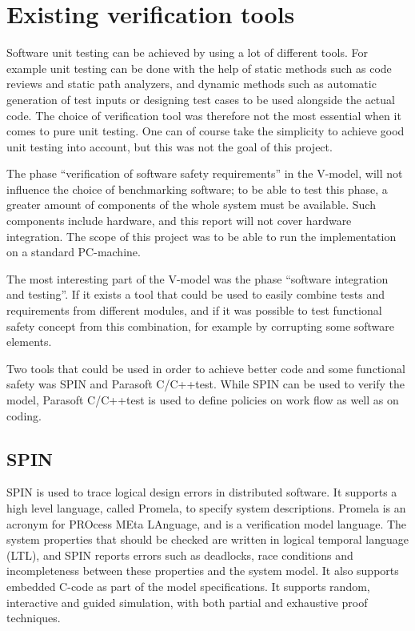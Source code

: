 \section{Existing verification tools}
\label{SEC:EXISTING_TOOLS}
Software unit testing can be achieved by using a lot of different tools. For
example unit testing can be done with the help of static methods such as code
reviews and static path analyzers, and dynamic methods such as automatic
generation of test inputs or designing test cases to be used alongside the
actual code. The choice of verification tool was therefore not the most
essential when it comes to pure unit testing. One can of course take the
simplicity to achieve good unit testing into account, but this was not the goal
of this project. \cite{UnitTesting} \cite{ArtOfSoftwareTesting}

The phase ``verification of software safety requirements'' in the V-model, will
not influence the choice of benchmarking software; to be able to test
this phase, a greater amount of components of the whole system must be
available. Such components include hardware, and this report will not cover
hardware integration. The scope of this project was to be able to run the
implementation on a standard PC-machine.

The most interesting part of the V-model was the phase ``software
integration and testing''. If it exists a tool that could be used to
easily combine tests and requirements from different modules, and if
it was possible to test functional safety concept from this
combination, for example by corrupting some software elements.

Two tools that could be used in order to achieve better code and some
functional safety was SPIN and Parasoft C/C++test. While SPIN can
be used to verify the model, Parasoft C/C++test is used to define policies on
work flow as well as on coding.

\subsection{SPIN}
SPIN is used to trace logical design errors in distributed
software. It supports a high level language, called Promela,
to specify system descriptions. Promela is an acronym for PROcess MEta
LAnguage, and is a verification model language. The system properties
that should be checked are written in logical temporal language
(LTL), and SPIN reports errors such as deadlocks, race conditions and
incompleteness between these properties and the system model. It also
supports embedded C-code as part of the model specifications. It
supports random, interactive and guided simulation, with both partial
and exhaustive proof techniques.
\cite{SPIN:manual}

